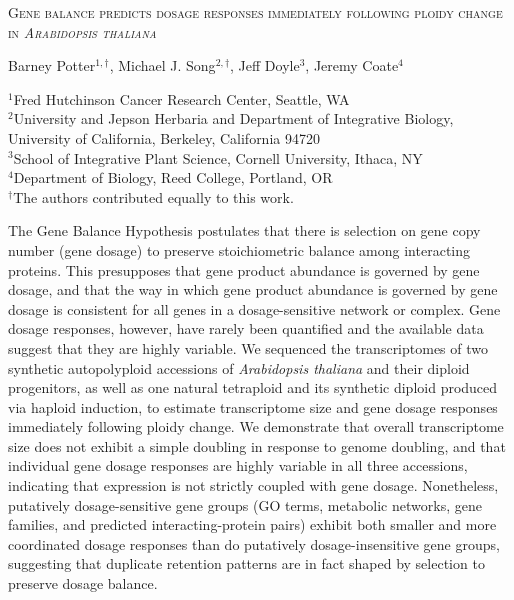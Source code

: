 \documentclass[11pt]{article}
\begin{document}

\begin{center}
    \fontsize{12}{12}\textsc{Gene balance predicts dosage responses immediately following ploidy change in {\it Arabidopsis thaliana}}

\vfill

Barney Potter$^{1,\dagger}$, Michael J. Song$^{2,\dagger}$, Jeff Doyle$^{3}$, Jeremy Coate$^{4}$

\end{center}

\vfill

\noindent$^{1}$Fred Hutchinson Cancer Research Center, Seattle, WA\\

\noindent$^{2}$University and Jepson Herbaria and Department of Integrative Biology, University of California, Berkeley, California 94720\\

\noindent$^{3}$School of Integrative Plant Science, Cornell University, Ithaca, NY\\

\noindent$^{4}$Department of Biology, Reed College, Portland, OR\\

\noindent$^{\dagger}$The authors contributed equally to this work. 
	

\vfill
\modulolinenumbers[5]
\linenumbers


The Gene Balance Hypothesis postulates that there is selection on gene copy number (gene dosage) to preserve stoichiometric balance among interacting proteins. This presupposes that gene product abundance is governed by gene dosage, and that the way in which gene product abundance is governed by gene dosage is consistent for all genes in a dosage-sensitive network or complex. Gene dosage responses, however, have rarely been quantified and the available data suggest that they are highly variable. We sequenced the transcriptomes of two synthetic autopolyploid accessions of {\it Arabidopsis thaliana} and their diploid progenitors, as well as one natural tetraploid and its synthetic diploid produced via haploid induction, to estimate transcriptome size and gene dosage responses immediately following ploidy change. We demonstrate that overall transcriptome size does not exhibit a simple doubling in response to genome doubling, and that individual gene dosage responses are highly variable in all three accessions, indicating that expression is not strictly coupled with gene dosage. Nonetheless, putatively dosage-sensitive gene groups (GO terms, metabolic networks, gene families, and predicted interacting-protein pairs) exhibit both smaller and more coordinated dosage responses than do putatively dosage-insensitive gene groups, suggesting that duplicate retention patterns are in fact shaped by selection to preserve dosage balance.
\end{document}
